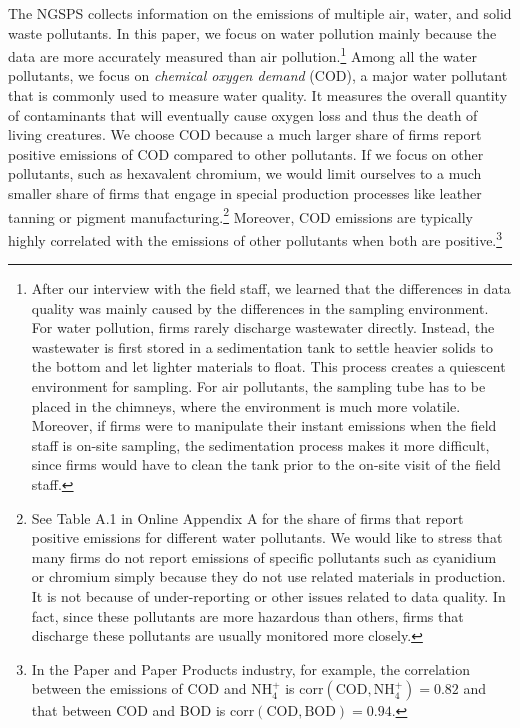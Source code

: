 \documentclass[AEJ]{AEA}
\begin{document}
The NGSPS collects information on the emissions of multiple air, water, and solid waste pollutants. In this paper, we focus on water pollution mainly because the data are more accurately measured than air pollution.\footnote{After our interview with the field staff, we learned that the differences in data quality was mainly caused by the differences in the sampling environment. For water pollution, firms rarely discharge wastewater directly. Instead, the wastewater is first stored in a sedimentation tank to settle heavier solids to the bottom and let lighter materials to float. This process creates a quiescent environment for sampling. For air pollutants, the sampling tube has to be placed in the chimneys, where the environment is much more volatile. Moreover, if firms were to manipulate their instant emissions when the field staff is on-site sampling, the sedimentation process makes it more difficult, since firms would have to clean the tank prior to the on-site visit of the field staff.} Among all the water pollutants, we focus on \textit{chemical oxygen demand} (COD), a major water pollutant that is commonly used to measure water quality. It measures the overall quantity of contaminants that will eventually cause oxygen loss and thus the death of living creatures. We choose COD because a much larger share of firms report positive emissions of COD compared to other pollutants. If we focus on other pollutants, such as hexavalent chromium, we would limit ourselves to a much smaller share of firms that engage in special production processes like leather tanning or pigment manufacturing.\footnote{See Table A.1 in Online Appendix A for the share of firms that report positive emissions for different water pollutants. We would like to stress that many firms do not report emissions of specific pollutants such as cyanidium or chromium simply because they do not use related materials in production. It is not because of under-reporting or other issues related to data quality. In fact, since these pollutants are more hazardous than others, firms that discharge these pollutants are usually monitored more closely.} Moreover, COD emissions are typically highly correlated with the emissions of other pollutants when both are positive.\footnote{In the Paper and Paper Products industry, for example, the correlation between the emissions of COD and $\text{NH}_4^+$ is $\text{corr}(\text{COD},\text{NH}_4^+) = \text{0.82}$ and that between COD and BOD is $\text{corr}(\text{COD},\text{BOD}) = \text{0.94}$.}
\end{document}
